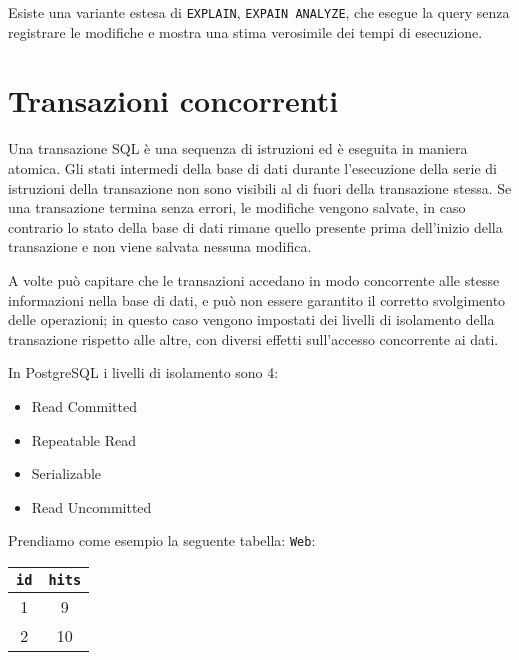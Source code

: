 \documentclass[a4paper, 10pt]{article}
\begin{document}
	Esiste una variante estesa di \lstinline|EXPLAIN|, \lstinline|EXPAIN ANALYZE|, che esegue la query senza registrare le modifiche e mostra una stima verosimile dei tempi di esecuzione.

	\newpage
	
		\section{Transazioni concorrenti}
	Una transazione SQL è una sequenza di istruzioni ed è eseguita in maniera atomica.
	Gli stati intermedi della base di dati durante l'esecuzione della serie di istruzioni della transazione non sono visibili al di fuori della transazione stessa.
	Se una transazione termina senza errori, le modifiche vengono salvate, in caso contrario lo stato della base di dati rimane quello presente prima dell'inizio della transazione e non viene salvata nessuna modifica.
	
	A volte può capitare che le transazioni accedano in modo concorrente alle stesse informazioni nella base di dati, e può non essere garantito il corretto svolgimento delle operazioni; in questo caso vengono impostati dei livelli di isolamento della transazione rispetto alle altre, con diversi effetti sull'accesso concorrente ai dati.
	
	In PostgreSQL i livelli di isolamento sono 4:
		\begin{itemize}
			\item Read Committed
			\item Repeatable Read
			\item Serializable
			\item Read Uncommitted
		\end{itemize}
		Prendiamo come esempio la seguente tabella:
		\lstinline|Web|:
		\begin{tabular}{cc}
			\toprule
			\lstinline|id| & \lstinline|hits| \\
			\midrule
			1 & 9 \\
			2 & 10 \\
			\midrule
		\end{tabular}
		
\end{document}
